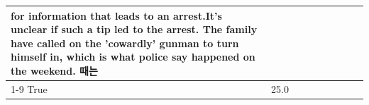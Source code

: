 \begin{table}[H]
\begin{tabular}{lllrlllll}
for information that leads to an arrest.It's unclear if such a tip led to the arrest. The family have called on the 'cowardly' gunman to turn himself in, which is what police say happened on the weekend. 때는 \\
\cline{1-9}
True & 25.0%
\end{tabular}
\end{table}
